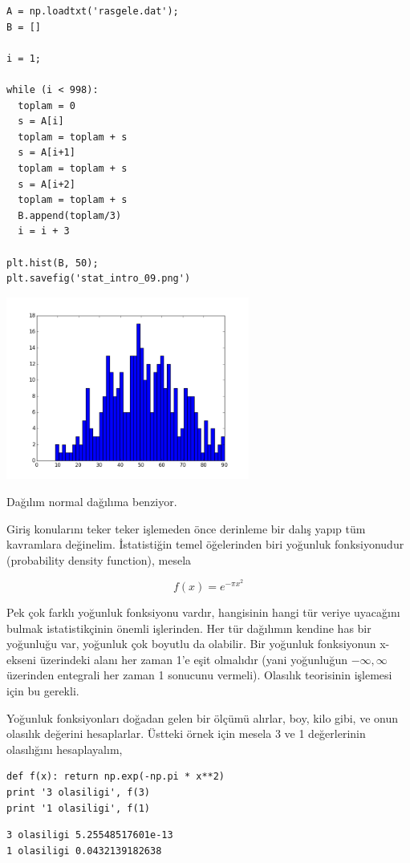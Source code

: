 \documentclass[12pt,fleqn]{article}\usepackage{../../common}
\begin{document}
\begin{verbatim}
A = np.loadtxt('rasgele.dat');
B = []

i = 1;

while (i < 998):
  toplam = 0
  s = A[i]
  toplam = toplam + s
  s = A[i+1]
  toplam = toplam + s
  s = A[i+2]
  toplam = toplam + s
  B.append(toplam/3)
  i = i + 3

plt.hist(B, 50);
plt.savefig('stat_intro_09.png')
\end{verbatim}

\includegraphics[height=6cm]{stat_intro_09.png}

Dağılım normal dağılıma benziyor.

Giriş konularını teker teker işlemeden önce derinleme bir dalış yapıp tüm
kavramlara değinelim. İstatistiğin temel öğelerinden biri yoğunluk fonksiyonudur
(probability density function), mesela

$$ f(x) = e^{-\pi x^2} $$

Pek çok farklı yoğunluk fonksiyonu vardır, hangisinin hangi tür veriye uyacağını
bulmak istatistikçinin önemli işlerinden. Her tür dağılımın kendine has bir
yoğunluğu var, yoğunluk çok boyutlu da olabilir. Bir yoğunluk fonksiyonun
x-ekseni üzerindeki alanı her zaman 1'e eşit olmalıdır (yani yoğunluğun
$-\infty,\infty$ üzerinden entegrali her zaman 1 sonucunu vermeli). Olasılık
teorisinin işlemesi için bu gerekli.

Yoğunluk fonksiyonları doğadan gelen bir ölçümü alırlar, boy, kilo gibi, ve
onun olasılık değerini hesaplarlar. Üstteki örnek için mesela 3 ve 1
değerlerinin olasılığını hesaplayalım,

\begin{verbatim}
def f(x): return np.exp(-np.pi * x**2)
print '3 olasiligi', f(3)
print '1 olasiligi', f(1)
\end{verbatim}

\begin{verbatim}
3 olasiligi 5.25548517601e-13
1 olasiligi 0.0432139182638
\end{verbatim}
\end{document}
